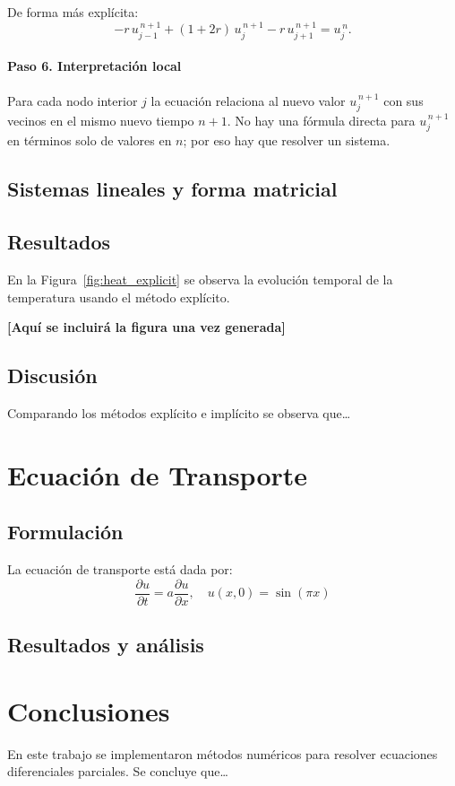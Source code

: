 \documentclass[12pt,a4paper]{article}
\begin{document}
De forma más explícita:
\[
-r\,u_{j-1}^{\,n+1} + (1+2r)\,u_j^{\,n+1} - r\,u_{j+1}^{\,n+1} = u_j^{\,n}.
\]

\paragraph{Paso 6. Interpretación local}  
Para cada nodo interior \(j\) la ecuación relaciona al nuevo valor \(u_j^{\,n+1}\) con sus vecinos en el mismo nuevo tiempo \(n+1\). No hay una fórmula directa para \(u_j^{\,n+1}\) en términos solo de valores en \(n\); por eso hay que resolver un sistema.

\subsection{Sistemas lineales y forma matricial}

\subsection{Resultados}
En la Figura~\ref{fig:heat_explicit} se observa la evolución temporal de la temperatura usando el método explícito.


\textbf{[Aquí se incluirá la figura una vez generada]}

\subsection{Discusión}
Comparando los métodos explícito e implícito se observa que\ldots

\section{Ecuación de Transporte}
\subsection{Formulación}
La ecuación de transporte está dada por:
\begin{equation}
    \frac{\partial u}{\partial t} = a \frac{\partial u}{\partial x}, \quad
    u(x,0) = \sin(\pi x)
\end{equation}

\subsection{Resultados y análisis}

\section{Conclusiones}
En este trabajo se implementaron métodos numéricos para resolver ecuaciones diferenciales parciales. 
Se concluye que\ldots
\end{document}
